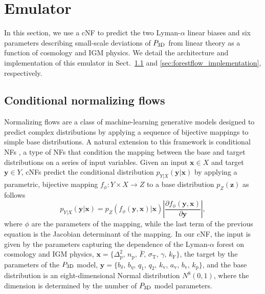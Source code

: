\documentclass[longauth]{aa}
\newcommand{\lya}{Lyman-$\alpha$\xspace}
\newcommand{\lyaf}{Lyman-$\alpha$ forest\xspace}
\newcommand{\pthreed}{\ensuremath{P_{\rm 3D}}\xspace}
\newcommand{\mflux}{\ensuremath{\bar{F}}\xspace}
\begin{document}
\section{Emulator}
\label{sec:forestflow}

In this section, we use a cNF to predict the two \lya linear biases and six parameters describing small-scale deviations of \pthreed from linear theory as a function of cosmology and IGM physics. We detail the architecture and implementation of this emulator in Sect.~\ref{sec:forestflow_NF} and \ref{sec:forestflow_implementation}, respectively.


\subsection{Conditional normalizing flows}
\label{sec:forestflow_NF}

Normalizing flows \citep[NFs;][]{NF_Rezende2015} are a class of machine-learning generative models designed to predict complex distributions by applying a sequence of bijective mappings to simple base distributions. A natural extension to this framework is conditional NFs \citep[cNFs;][]{Winkler2019, cNF_Papamakarios}, a type of NFs that condition the mapping between the base and target distributions on a series of input variables. Given an input $\mathbf{x} \in X$ and target $\mathbf{y} \in Y$, cNFs predict the conditional distribution $p_{Y|X}(\mathbf{y}|\mathbf{x})$ by applying a parametric, bijective mapping $f_\phi: Y\times X \to Z$ to a base distribution $p_{Z}(\mathbf{z})$ as follows
%
\begin{equation}
    \label{eq:cNF_pdf}
    p_{Y|X}(\mathbf{y}|\mathbf{x}) = p_{Z}(f_\phi(\mathbf{y}, \mathbf{x})|\mathbf{x}) \left|\frac{\partial f_\phi(\mathbf{y}, \mathbf{x})}{\partial \mathbf{y}}\right|,
\end{equation}
%
where $\phi$ are the parameters of the mapping, while the last term of the previous equation is the Jacobian determinant of the mapping. In our cNF, the input is given by the parameters capturing the dependence of the \lyaf on cosmology and IGM physics, $\mathbf{x}=\{\Delta_\mathrm{p}^2,\, n_\mathrm{p},\, \mflux,\, \sigma_\mathrm{T},\, \gamma,\, k_\mathrm{F}\}$, the target by the parameters of the \pthreed model, $\mathbf{y}=\{b_\delta,\, b_\eta,\, q_1,\, q_2,\, k_\mathrm{v},\, a_\mathrm{v},\, b_\mathrm{v}, \, k_\mathrm{p}\}$, and the base distribution is an eight-dimensional Normal distribution $N^8(0,1)$, where the dimension is determined by the number of \pthreed model parameters.
\end{document}
